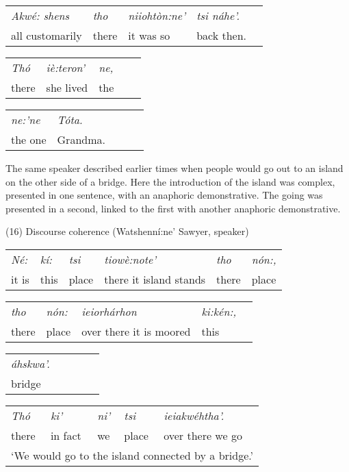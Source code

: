 \documentclass[output=paper,colorlinks,citecolor=brown
]{langscibook}
\begin{document}
\begin{tabular}{lllll}
\emph{Akwé: shens} & \emph{tho} & \emph{niiohtòn:ne'} & \emph{tsi náhe'.}\\

all customarily & there & it was so  & back then.
\end{tabular}\bigskip

\begin{tabular}{lllll}
\emph{Thó} & \emph{iè:teron'} &  \emph{ne,}\\

there & she lived & the
\end{tabular}\bigskip

\begin{tabular}{lllll}
\emph{ne:'ne} & \emph{Tóta.}\\
the one & Grandma.
\end{tabular}\bigskip


The same speaker described earlier times when people would go out to an island on the other side of a bridge. Here the introduction of the island was complex, presented in one sentence, with an anaphoric demonstrative. The going was presented in a second, linked to the first with another anaphoric demonstrative.\bigskip

(16) Discourse coherence (Watshenní:ne' Sawyer, speaker)\\

\begin{tabular}{llllll}
\emph{Né:} & \emph{kí:} & \emph{tsi} & \emph{tiowè:note'} & \emph{tho} & \emph{nón:,}\\

it is  & this & place & there it island stands & there & place
\end{tabular}\bigskip

\begin{tabular}{lllll}
\emph{tho} & \emph{nón:} & \emph{ieiorhárhon} & \emph{ki:kén:,}\\

there & place & over there it is moored & this
\end{tabular}\bigskip

\begin{tabular}{lllll}
\emph{áhskwa'.}\\

bridge
\end{tabular}\bigskip

\begin{tabular}{lllll}
\emph{Thó } & \emph{ki'} & \emph{ni'} & \emph{tsi} & \emph{ ieiakwéhtha'.}\\

there & in fact &  we  & place & over there we go\\
\multicolumn{5}{l}{`We would go to the island connected by a bridge.'}
\end{tabular}\bigskip
\end{document}

